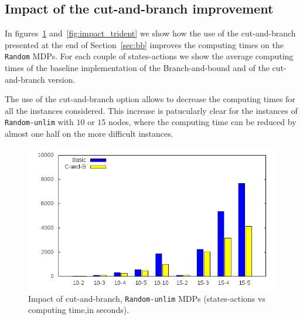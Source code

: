 

\subsection{Impact of the cut-and-branch improvement}

In figures~\ref{fig:impact_random} and~\ref{fig:impact_trident} we show how the use of the cut-and-branch presented at the end of Section~\ref{sec:bb} improves the computing times on the \texttt{Random} MDPs.
For each couple of states-actions we show the average computing times of the baseline implementation of the Branch-and-bound and of the cut-and-branch version.

The use of the cut-and-branch option allows to decrease the computing times for all the instances considered. This increase is patucularly clear for the instances of \texttt{Random-unlim} with $10$ or $15$ nodes, where the computing time can be reduced by almost one half on the more difficult instances.

\begin{figure}[]
	\begin{center}
    \includegraphics[scale=0.45]{GNUPLOT/output_random.png}
	\end{center}
	\caption{Impact of cut-and-branch, \texttt{Random-unlim} MDPs (states-actions vs computing time,in seconds).}
	\label{fig:impact_random} 
\end{figure}

